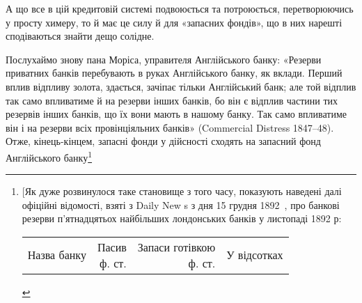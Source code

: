 А що все в цій кредитовій системі подвоюється та потроюється, перетворюючись
у просту химеру, то й має це силу й для «запасних фондів», що в них
нарешті сподіваються знайти дещо солідне.

Послухаймо знову пана Моріса, управителя Англійського банку: «Резерви
приватних банків перебувають в руках Англійського банку, як вклади. Перший
вплив відпливу золота, здається, зачіпає тільки Англійський банк; але той
відплив так само впливатиме й на резерви інших банків, бо він є відплив
частини тих резервів інших банків, що їх вони мають в нашому банку. Так
само впливатиме він і на резерви всіх провінціяльних банків» (Commercial
Distress 1847--48). Отже, кінець-кінцем, запасні фонди у дійсності сходять на
запасний фонд Англійського банку\footnote{
[Як дуже розвинулося таке становище з того часу, показують наведені далі офіційні відомості,
взяті з Daily New s з дня 15 грудня 1892~, про банкові резерви п’ятнадцятьох найбільших
лондонських
банків у листопаді 1892 р:

  \begin{tabularx}{\textwidth}{l r r r}

  Назва банку & \makecell{Пасив \\ ф. ст.} & \makecell{Запаси готівкою \\ ф. ст.} & У відсотках \\


\end{tabularx}}
